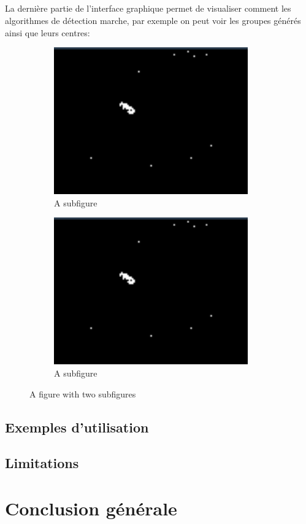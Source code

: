 \documentclass[12pt]{report}
\begin{document}
\paragraph{}
La dernière partie de l’interface graphique permet de visualiser comment les algorithmes de détection marche, par exemple on peut voir les groupes générés ainsi que leurs centres:
\begin{figure}
	\centering
	\begin{subfigure}{.5\textwidth}
		\centering
		\includegraphics[width=.4\linewidth]{imgs/notGrouped.png}
		\caption{A subfigure}
		\label{fig:sub1}
	\end{subfigure}%
	\begin{subfigure}{.5\textwidth}
		\centering
		\includegraphics[width=.4\linewidth]{imgs/notGrouped.png}
		\caption{A subfigure}
		\label{fig:sub2}
	\end{subfigure}
	\caption{A figure with two subfigures}
	\label{fig:test}
\end{figure}


\section{Exemples d'utilisation}
\section{Limitations}

\chapter{Conclusion générale}
\paragraph{}
\end{document}
